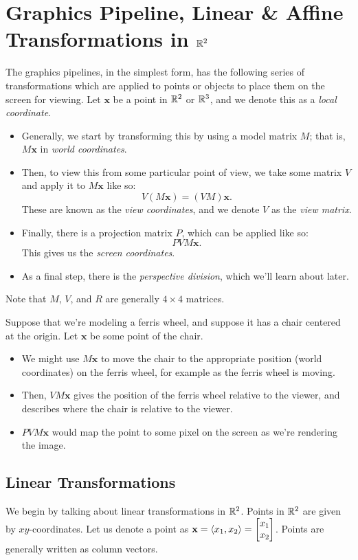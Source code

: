 \documentclass[letterpaper]{article}
\begin{document}
\newpage 
\section{Graphics Pipeline, Linear \& Affine Transformations in \texorpdfstring{$\mathbb{R}^2$}{R2}}
The graphics pipelines, in the simplest form, has the following series of transformations which are applied to points or objects to place them on the screen for viewing. Let $\textbf{x}$ be a point in $\mathbb{R}^2$ or $\mathbb{R}^3$, and we denote this as a \emph{local coordinate}. 
\begin{itemize}
    \item Generally, we start by transforming this by using a model matrix $M$; that is, $M\mathbf{x}$ in \emph{world coordinates}.
    
    \item Then, to view this from some particular point of view, we take some matrix $V$ and apply it to $M\mathbf{x}$ like so: 
    \[V(M\mathbf{x}) = (VM)\mathbf{x}.\] 
    These are known as the \emph{view coordinates}, and we denote $V$ as the \emph{view matrix}.

    \item Finally, there is a projection matrix $P$, which can be applied like so: 
    \[PVM\textbf{x}.\]
    This gives us the \emph{screen coordinates}. 

    \item As a final step, there is the \emph{perspective division}, which we'll learn about later.
\end{itemize}
Note that $M$, $V$, and $R$ are generally $4 \times 4$ matrices. 

\bigskip 

Suppose that we're modeling a ferris wheel, and suppose it has a chair centered at the origin. Let $\mathbf{x}$ be some point of the chair. 
\begin{itemize}
    \item We might use $M\mathbf{x}$ to move the chair to the appropriate position (world coordinates) on the ferris wheel, for example as the ferris wheel is moving. 
    \item Then, $VM\mathbf{x}$ gives the position of the ferris wheel relative to the viewer, and describes where the chair is relative to the viewer. 
    \item $PVM\mathbf{x}$ would map the point to some pixel on the screen as we're rendering the image. 
\end{itemize}

\subsection{Linear Transformations}
We begin by talking about linear transformations in $\mathbb{R}^2$. Points in $\mathbb{R}^2$ are given by $xy$-coordinates. Let us denote a point as $\mathbf{x} = \langle x_1, x_2 \rangle = \begin{bmatrix}
    x_1 \\ x_2
\end{bmatrix}$. Points are generally written as column vectors.
\end{document}
